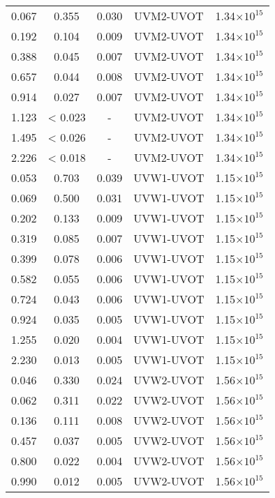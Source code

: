 \documentclass{aa}
\begin{document}
{\begin{longtable}{c|c|c|c|c}
  0.067 &   0.355 &  0.030 & UVM2-UVOT &  1.34$\times 10^{15}$    \\
  0.192 &   0.104 &  0.009 & UVM2-UVOT &  1.34$\times 10^{15}$    \\
  0.388 &   0.045 &  0.007 & UVM2-UVOT &  1.34$\times 10^{15}$    \\
  0.657 &   0.044 &  0.008 & UVM2-UVOT &  1.34$\times 10^{15}$    \\
  0.914 &   0.027 &  0.007 & UVM2-UVOT &  1.34$\times 10^{15}$    \\
  1.123 & < 0.023 &  -     & UVM2-UVOT &  1.34$\times 10^{15}$    \\
  1.495 & < 0.026 &  -     & UVM2-UVOT &  1.34$\times 10^{15}$    \\
  2.226 & < 0.018 &  -     & UVM2-UVOT &  1.34$\times 10^{15}$    \\
  0.053 &   0.703 &  0.039 & UVW1-UVOT &  1.15$\times 10^{15}$    \\
  0.069 &   0.500 &  0.031 & UVW1-UVOT &  1.15$\times 10^{15}$    \\
  0.202 &   0.133 &  0.009 & UVW1-UVOT &  1.15$\times 10^{15}$    \\
  0.319 &   0.085 &  0.007 & UVW1-UVOT &  1.15$\times 10^{15}$    \\
  0.399 &   0.078 &  0.006 & UVW1-UVOT &  1.15$\times 10^{15}$    \\
  0.582 &   0.055 &  0.006 & UVW1-UVOT &  1.15$\times 10^{15}$    \\
  0.724 &   0.043 &  0.006 & UVW1-UVOT &  1.15$\times 10^{15}$    \\
  0.924 &   0.035 &  0.005 & UVW1-UVOT &  1.15$\times 10^{15}$    \\
  1.255 &   0.020 &  0.004 & UVW1-UVOT &  1.15$\times 10^{15}$    \\
  2.230 &   0.013 &  0.005 & UVW1-UVOT &  1.15$\times 10^{15}$    \\
  0.046 &   0.330 &  0.024 & UVW2-UVOT &  1.56$\times 10^{15}$    \\
  0.062 &   0.311 &  0.022 & UVW2-UVOT &  1.56$\times 10^{15}$    \\
  0.136 &   0.111 &  0.008 & UVW2-UVOT &  1.56$\times 10^{15}$    \\
  0.457 &   0.037 &  0.005 & UVW2-UVOT &  1.56$\times 10^{15}$    \\
  0.800 &   0.022 &  0.004 & UVW2-UVOT &  1.56$\times 10^{15}$    \\
  0.990 &   0.012 &  0.005 & UVW2-UVOT &  1.56$\times 10^{15}$    \\

\end{longtable}}
\end{document}

